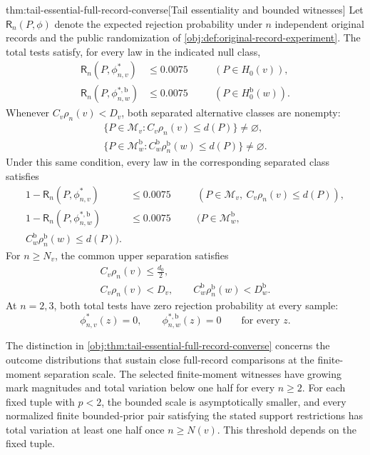 \documentclass[11pt]{article}
\begin{document}
\begin{theoremv}{thm:tail-essential-full-record-converse}[Tail essentiality and bounded witnesses]
Let \(\mathsf R_n(P,\phi)\) denote the expected rejection probability under \(n\) independent original records and the public randomization of
\cref{obj:def:original-record-experiment}. The total tests satisfy, for every law in the indicated null class,
\[
\begin{aligned}
\mathsf R_n(P,\phi^*_{n,v})&\le0.0075
&&\quad(P\in H_0(v)),\\
\mathsf R_n(P,\phi^{*,\mathrm b}_{n,w})&\le0.0075
&&\quad(P\in H_0^{\mathrm b}(w)).
\end{aligned}
\]
Whenever \(C_v\rho_n(v)<D_v\), both separated alternative classes are nonempty:
\[
\begin{gathered}
\{P\in\mathcal M_v:C_v\rho_n(v)\le d(P)\}\ne\varnothing,\\
\{P\in\mathcal M^{\mathrm b}_w:
C_w^{\mathrm b}\rho_n^{\mathrm b}(w)\le d(P)\}\ne\varnothing.
\end{gathered}
\]
Under this same condition, every law in the corresponding separated class satisfies
\[
\begin{aligned}
1-\mathsf R_n(P,\phi^*_{n,v})&\le0.0075
&&\quad(P\in\mathcal M_v,\ C_v\rho_n(v)\le d(P)),\\
1-\mathsf R_n(P,\phi^{*,\mathrm b}_{n,w})&\le0.0075
&&\quad(P\in\mathcal M^{\mathrm b}_w,\\
C_w^{\mathrm b}\rho_n^{\mathrm b}(w)\le d(P)).
\end{aligned}
\]
For \(n\ge N_v\), the common upper separation satisfies
\[
\begin{gathered}
C_v\rho_n(v)\le\frac{d_0}{2},\\
C_v\rho_n(v)<D_v,
\qquad
C_w^{\mathrm b}\rho_n^{\mathrm b}(w)<D_w^{\mathrm b}.
\end{gathered}
\]
At \(n=2,3\), both total tests have zero rejection probability at every sample:
\[
\phi^*_{n,v}(z)=0,
\qquad
\phi^{*,\mathrm b}_{n,w}(z)=0
\qquad\text{for every }z.
\]
\end{theoremv}

The distinction in \cref{obj:thm:tail-essential-full-record-converse} concerns the outcome distributions that sustain close full-record comparisons at the finite-moment separation scale. The selected finite-moment witnesses have growing mark magnitudes and total variation below one half for every \(n\ge2\). For each fixed tuple with \(p<2\), the bounded scale is asymptotically smaller, and every normalized finite bounded-prior pair satisfying the stated support restrictions has total variation at least one half once \(n\ge N(v)\). This threshold depends on the fixed tuple.
\end{document}
